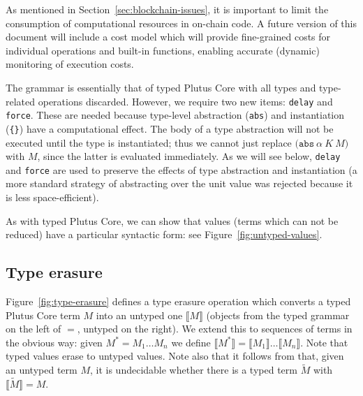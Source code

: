 \documentclass[a4paper]{article}
\newcommand{\keyword}[1]{\texttt{#1}}
\newcommand{\construct}[1]{\texttt{(} #1 \texttt{)}}
\newcommand{\abs}[3]{\construct{\keyword{abs} ~ #1 ~ #2 ~ #3}}
\newcommand{\lamU}[2]{\construct{\keyword{lam} ~ #1 ~ #2        }}
\newcommand{\appU}[2]{\texttt{[} #1 ~ #2 \texttt{]}}
\newcommand{\delay}[1]{\construct{\keyword{delay} ~ #1}}
\newcommand{\force}[1]{\construct{\keyword{force} ~ #1}}
\newcommand{\erase}[1]{\llbracket#1\rrbracket}
\begin{document}
As mentioned in Section~\ref{sec:blockchain-issues}, it is important to
limit the consumption of computational resources in on-chain code.  A
future version of this document will include a cost model which will
provide fine-grained costs for individual operations and built-in
functions, enabling accurate (dynamic) monitoring of execution costs.



\bigskip
\noindent The grammar is essentially that of typed Plutus Core with all types
and type-related operations discarded.  However, we require two new
items: \texttt{delay} and \texttt{force}.  These are needed because
type-level abstraction (\texttt{abs}) and instantiation (\texttt{\{\}})
have a computational effect.  The body of a type abstraction will not
be executed until the type is instantiated; thus we cannot just
replace $\abs{\alpha}{K}{M}$ with $M$, since the latter is evaluated
immediately.  As we will see below, \texttt{delay} and \texttt{force}
are used to preserve the effects of type abstraction and
instantiation (a more standard strategy of abstracting over the unit value was
rejected because it is less space-efficient).%

As with typed Plutus Core, we can show that values (terms which can
not be reduced) have a particular syntactic form: see
Figure~\ref{fig:untyped-values}.

\subsection{Type erasure}
Figure~\ref{fig:type-erasure} defines a type erasure operation which
converts a typed Plutus Core term $M$ into an untyped one $\erase{M}$
(objects from the typed grammar on the left of $=$, untyped on the
right).  We extend this to sequences of terms in the obvious way:
given $M^* = M_1 \ldots M_n$ we define $\erase{M^*}
= \erase{M_1} \ldots \erase{M_n}$.  Note that typed values erase to
untyped values.  Note also that it follows
from \cite{Wells-96-typability} that, given an untyped term $M$, it is
undecidable whether there is a typed term $\widetilde{M}$ with $\erase{\widetilde{M}} = M$.
\end{document}
